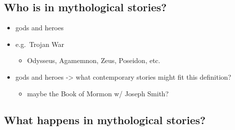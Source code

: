 \documentclass[
  12pt]{findlay}
\providecommand{\tightlist}{%
  \setlength{\itemsep}{0pt}\setlength{\parskip}{0pt}}
\begin{document}
\hypertarget{who-is-in-mythological-stories}{%
\subsection{Who is in mythological
stories?}\label{who-is-in-mythological-stories}}

\begin{itemize}
\tightlist
\item
  gods and heroes
\item
  e.g.~Trojan War

  \begin{itemize}
  \tightlist
  \item
    Odysseus, Agamemnon, Zeus, Poseidon, etc.
  \end{itemize}
\item
  gods and heroes -\textgreater{} what contemporary stories might fit
  this definition?

  \begin{itemize}
  \tightlist
  \item
    maybe the Book of Mormon w/ Joseph Smith?
  \end{itemize}
\end{itemize}

\hypertarget{what-happens-in-mythological-stories}{%
\subsection{What happens in mythological
stories?}\label{what-happens-in-mythological-stories}}
\end{document}
